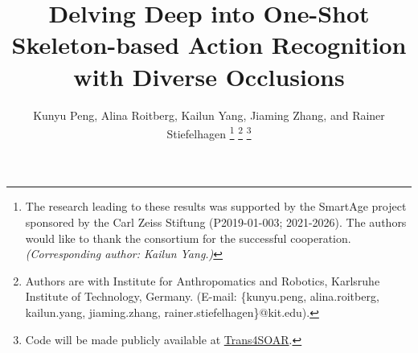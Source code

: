 \documentclass[lettersize,journal]{IEEEtran}
\begin{document}
\title{Delving Deep into One-Shot Skeleton-based Action Recognition with Diverse Occlusions}

\author{Kunyu Peng, Alina Roitberg, Kailun Yang, Jiaming Zhang, and Rainer Stiefelhagen
\thanks{The research leading to these results was supported by the SmartAge project sponsored by the Carl Zeiss Stiftung (P2019-01-003; 2021-2026).
The authors would like to thank the consortium for the successful cooperation.
\textit{(Corresponding author: Kailun Yang.)}
}
\thanks{Authors are with Institute for Anthropomatics and Robotics, Karlsruhe Institute of Technology, Germany. (E-mail: \{kunyu.peng, alina.roitberg, kailun.yang, jiaming.zhang, rainer.stiefelhagen\}@kit.edu).}
\thanks{Code will be made publicly available at \href{https://github.com/KPeng9510/Trans4SOAR}{Trans4SOAR}.}
}

\maketitle
\end{document}
